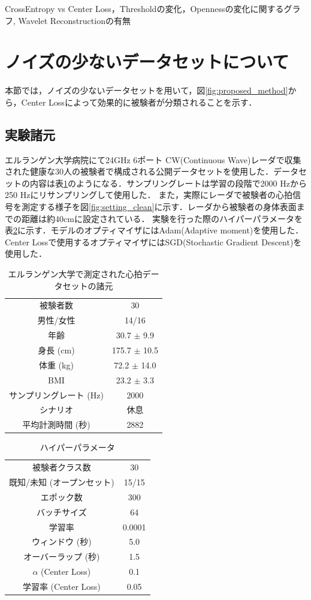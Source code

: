 CrossEntropy vs Center Loss，Thresholdの変化，Opennessの変化に関するグラフ, Wavelet Reconstructionの有無
\section{ノイズの少ないデータセットについて}
本節では，ノイズの少ないデータセットを用いて，図\ref{fig:proposed_method}から，Center Lossによって効果的に被験者が分類されることを示す．
\subsection{実験諸元}
エルランゲン大学病院にて24GHz 6ポート CW(Continuous Wave)レーダで収集された健康な30人の被験者で構成される公開データセットを使用した\cite{paper:30-dataset}．データセットの内容は表\ref{table:30-dataset}のようになる．サンプリングレートは学習の段階で2000 Hzから250 Hzにリサンプリングして使用した．
また，実際にレーダで被験者の心拍信号を測定する様子を図\ref{fig:setting_clean}に示す．レーダから被験者の身体表面までの距離は約40cmに設定されている．
実験を行った際のハイパーパラメータを表\ref{table:30-parameter}に示す．モデルのオプティマイザにはAdam(Adaptive moment)を使用した．Center Lossで使用するオプティマイザにはSGD(Stochastic Gradient Descent)を使用した．

\begin{table}[H]
\caption{エルランゲン大学で測定された心拍データセットの諸元}
\centering
\begin{tabular}{cc}
\hline
被験者数 & 30 \\
男性/女性 & 14/16 \\
年齢 & 30.7 $\pm$ 9.9 \\
身長 (cm) & 175.7 $\pm$ 10.5 \\
体重 (kg) & 72.2 $\pm$ 14.0 \\
BMI & 23.2 $\pm$ 3.3 \\
サンプリングレート (Hz) & 2000 \\
シナリオ & 休息 \\
平均計測時間 (秒) & 2882 \\
\hline
\end{tabular}
\label{table:30-dataset}
\end{table}

\begin{table}[H]
\caption{ハイパーパラメータ}
\centering
\begin{tabular}{cc}
\hline
被験者クラス数 & 30 \\
既知/未知 (オープンセット) & 15/15 \\
エポック数 & 300 \\
バッチサイズ & 64 \\
学習率 & 0.0001 \\
ウィンドウ (秒) & 5.0 \\
オーバーラップ (秒) & 1.5 \\
$\alpha$ (Center Loss) & 0.1 \\
学習率 (Center Loss) & 0.05 \\
\hline
\end{tabular}
\label{table:30-parameter}
\end{table}


